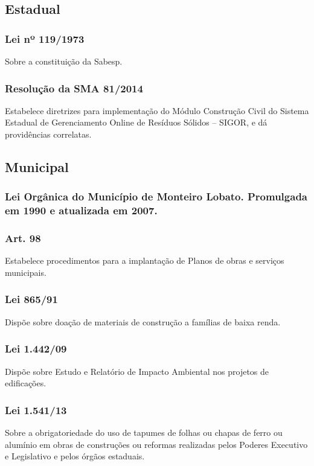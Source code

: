 \begin{subapend}
	\subsection{Estadual}
	\begin{subsubapend}
		\item \subsubsection{Lei nº 119/1973}
		Sobre a constituição da Sabesp.
		\subsubsection{Resolução da SMA 81/2014}
		Estabelece diretrizes para implementação do Módulo Construção Civil do Sistema Estadual de Gerenciamento Online de Resíduos Sólidos – SIGOR, e dá providências correlatas.
		\subsection{Municipal}
		\subsubsection{Lei Orgânica do Município de Monteiro Lobato. Promulgada em 1990 e atualizada em 2007.}
		\subsubsection{Art. 98}
		Estabelece procedimentos para a implantação de Planos de obras e serviços municipais.
		\subsubsection{Lei 865/91}
		Dispõe sobre doação de materiais de construção a famílias de baixa renda.
		\subsubsection{Lei 1.442/09}
		Dispõe sobre Estudo e Relatório de Impacto Ambiental nos projetos de edificações.
		\subsubsection{Lei 1.541/13}
		Sobre a obrigatoriedade do uso de tapumes de folhas ou chapas de ferro ou alumínio em obras de construções ou reformas realizadas pelos Poderes Executivo e Legislativo e pelos órgãos estaduais.
	\end{subsubapend}
\end{subapend}



